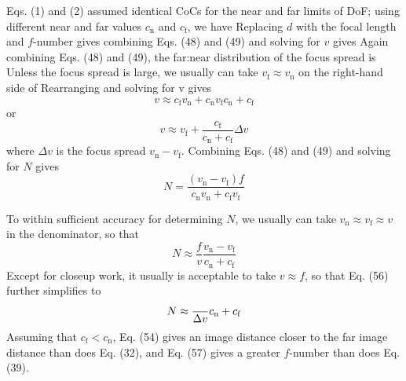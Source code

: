 \documentclass[11pt, oneside]{scrartcl}   	%
\newcommand{\Dv}{\ensuremath{\Delta v}}
\begin{document}
Eqs. (1) and (2) assumed identical CoCs for the near and far limits of DoF; using different near and far values $c_\mathrm{n}$ and $c_\mathrm{f}$, we have
Replacing $d$ with the focal length and $f$-number gives
combining Eqs. (48) and (49) and solving for $v$ gives
Again combining Eqs. (48) and (49), the far:near distribution of the focus spread is
Unless the focus spread is large, we usually can take $v_\mathrm{f} \approx v_\mathrm{n}$ on the right-hand side of
Rearranging and solving for v gives
\begin{equation}
   v\approx{c_\mathrm{f}v_\mathrm{n}+c_\mathrm{n}v_\mathrm{f}}{c_\mathrm{n}+c_\mathrm{f}}
   \label{eq:53}
\end{equation}
or
\begin{equation}
   v\approx v_\mathrm{f}+\frac{c_\mathrm{f}}{c_\mathrm{n}+c_\mathrm{f}}\Dv
   \label{eq:54}
\end{equation}
where $Δv$ is the focus spread $v_\mathrm{n} - v_\mathrm{f}$. Combining Eqs. (48) and (49) and solving for $N$ gives
\begin{equation}
   N=\frac{(v_\mathrm{n}-v_\mathrm{f})f}{c_\mathrm{n}v_\mathrm{n}+c_\mathrm{f}v_\mathrm{f}}
   \label{eq:55}
\end{equation}

To within sufficient accuracy for determining $N$, we usually can take $v_\mathrm{n} \approx v_\mathrm{f} \approx v$ in the denominator, so that
\begin{equation}
   N\approx\frac f v \frac{v_\mathrm{n}-v_\mathrm{f}}{c_\mathrm{n}+c_\mathrm{f}}
   \label{eq:56}
\end{equation}
Except for closeup work, it usually is acceptable to take $v \approx f$, so that Eq. (56) further simplifies to
\begin{equation}
   N\approx\frac \Dv{c_\mathrm{n}+c_\mathrm{f}}
   \label{eq:57}
\end{equation}
Assuming that $c_\mathrm{f} < c_\mathrm{n}$, Eq. (54) gives an image distance closer to the far image distance than does Eq. (32), and Eq. (57) gives a greater $f$-number than does Eq. (39).
\end{document}
